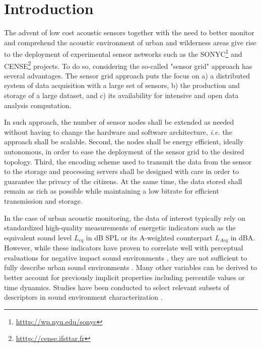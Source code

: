 \documentclass[sensors,article,submit,moreauthors,pdftex,10pt,a4paper]{mdpi}
\begin{document}


\section{Introduction}

The advent of low cost acoustic sensors together with the need to better monitor and comprehend the acoustic environment of urban and wilderness areas give rise to the deployment of experimental sensor networks such as the SONYC\footnote{\url{htttp://wp.nyu.edu/sonyc}} \cite{mydlarz2017implementation} and CENSE\footnote{\url{htttp://cense.ifsttar.fr}} \cite{picault2017} projects. To do so, considering the so-called "sensor grid" approach  \cite{lim2005sensor,tham2005sensorgrid} has several advantages. The sensor grid approach puts the focus on a) a distributed system of data acquisition with a large set of sensors, b) the production and storage of a large dataset, and c) its availability for intensive and open data analysis computation.

In such approach, the number of sensor nodes shall be extended as needed without having to change the hardware and software architecture, \textit{i.e.} the approach shall be scalable. Second, the nodes shall be energy efficient, ideally autonomous, in order to ease the deployment of the sensor grid to the desired topology. Third, the encoding scheme used to transmit the data from the sensor to the storage and processing servers shall be designed with care in order to guarantee the privacy of the citizens. At the same time, the data stored shall remain as rich as possible while maintaining a low bitrate for efficient transmission and storage.

In the case of urban acoustic monitoring, the data of interest typically rely on standardized high-quality measurements of energetic indicators such as the equivalent sound level $L_{eq}$ in dB SPL or its A-weighted counterpart $L_{Aeq}$ in dBA. However, while these indicators have proven to correlate well with perceptual evaluations for negative impact sound environments \cite{gozalo2015}, they are not sufficient to fully describe urban sound environments \cite{rychtarikova2013}. Many other variables can be derived to better account for previously implicit properties \cite{can2016} including percentile values or time dynamics. Studies have been conducted to select relevant subsets of descriptors in sound environment characterization \cite{can2015, brocolini2013, nilsson2007}.
\end{document}
